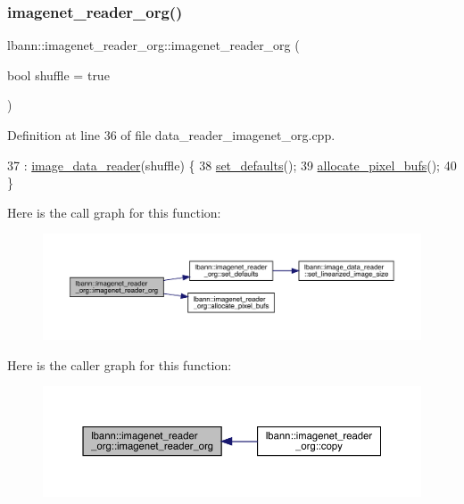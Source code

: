 \subsubsection{\texorpdfstring{imagenet\+\_\+reader\+\_\+org()}{imagenet\_reader\_org()}\hspace{0.1cm}{\footnotesize\ttfamily [1/2]}}
{\footnotesize\ttfamily lbann\+::imagenet\+\_\+reader\+\_\+org\+::imagenet\+\_\+reader\+\_\+org (\begin{DoxyParamCaption}\item[{bool}]{shuffle = {\ttfamily true} }\end{DoxyParamCaption})}



Definition at line 36 of file data\+\_\+reader\+\_\+imagenet\+\_\+org.\+cpp.


\begin{DoxyCode}
37   : \hyperlink{classlbann_1_1image__data__reader_a582185ab03c4643117fd93e0ba843882}{image\_data\_reader}(shuffle) \{
38   \hyperlink{classlbann_1_1imagenet__reader__org_af0d9fc9081013ef0ddd3222dfd9abb8b}{set\_defaults}();
39   \hyperlink{classlbann_1_1imagenet__reader__org_acbe8ed442b64a7391ffa63b0658641c0}{allocate\_pixel\_bufs}();
40 \}
\end{DoxyCode}
Here is the call graph for this function\+:\nopagebreak
\begin{figure}[H]
\begin{center}
\leavevmode
\includegraphics[width=350pt]{classlbann_1_1imagenet__reader__org_a77d88b53b26f903855da22e5d77ef06a_cgraph}
\end{center}
\end{figure}
Here is the caller graph for this function\+:\nopagebreak
\begin{figure}[H]
\begin{center}
\leavevmode
\includegraphics[width=350pt]{classlbann_1_1imagenet__reader__org_a77d88b53b26f903855da22e5d77ef06a_icgraph}
\end{center}
\end{figure}
\mbox{\label{classlbann_1_1imagenet__reader__org_acb398613b049223104df1c708483da80}} 
